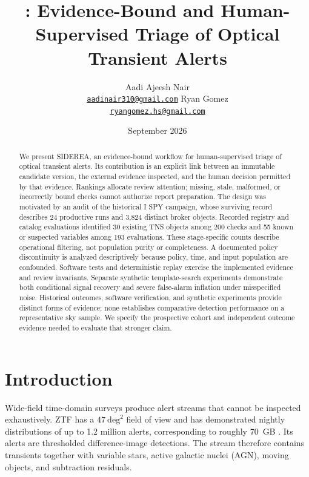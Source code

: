 \documentclass[11pt]{article}
\title{\siderea: Evidence-Bound and Human-Supervised Triage of Optical Transient Alerts}
\author{
  Aadi Ajeesh Nair\\[-1pt]
  {\normalfont\small\href{mailto:aadinair310@gmail.com}{\texttt{aadinair310@gmail.com}}}
  \And
  Ryan Gomez\\[-1pt]
  {\normalfont\small\href{mailto:ryangomez.hs@gmail.com}{\texttt{ryangomez.hs@gmail.com}}}
}
\date{September 2026}
\newcommand{\siderea}{SIDEREA}
\begin{document}
\maketitle

\begin{abstract}
We present \siderea, an evidence-bound workflow for human-supervised triage of optical transient alerts. Its contribution is an explicit link between an immutable candidate version, the external evidence inspected, and the human decision permitted by that evidence. Rankings allocate review attention; missing, stale, malformed, or incorrectly bound checks cannot authorize report preparation. The design was motivated by an audit of the historical I SPY campaign, whose surviving record describes 24 productive runs and 3,824 distinct broker objects. Recorded registry and catalog evaluations identified 30 existing TNS objects among 200 checks and 55 known or suspected variables among 193 evaluations. These stage-specific counts describe operational filtering, not population purity or completeness. A documented policy discontinuity is analyzed descriptively because policy, time, and input population are confounded. Software tests and deterministic replay exercise the implemented evidence and review invariants. Separate synthetic template-search experiments demonstrate both conditional signal recovery and severe false-alarm inflation under misspecified noise. Historical outcomes, software verification, and synthetic experiments provide distinct forms of evidence; none establishes comparative detection performance on a representative sky sample. We specify the prospective cohort and independent outcome evidence needed to evaluate that stronger claim.
\end{abstract}


\section{Introduction}
\label{sec:introduction}

Wide-field time-domain surveys produce alert streams that cannot be inspected exhaustively. ZTF has a $47~\mathrm{deg}^{2}$ field of view and has demonstrated nightly distributions of up to 1.2 million alerts, corresponding to roughly 70~GB \citep{bellm2019,graham2019,masci2019,patterson2019}. Its alerts are thresholded difference-image detections. The stream therefore contains transients together with variable stars, active galactic nuclei (AGN), moving objects, and subtraction residuals.
\end{document}
